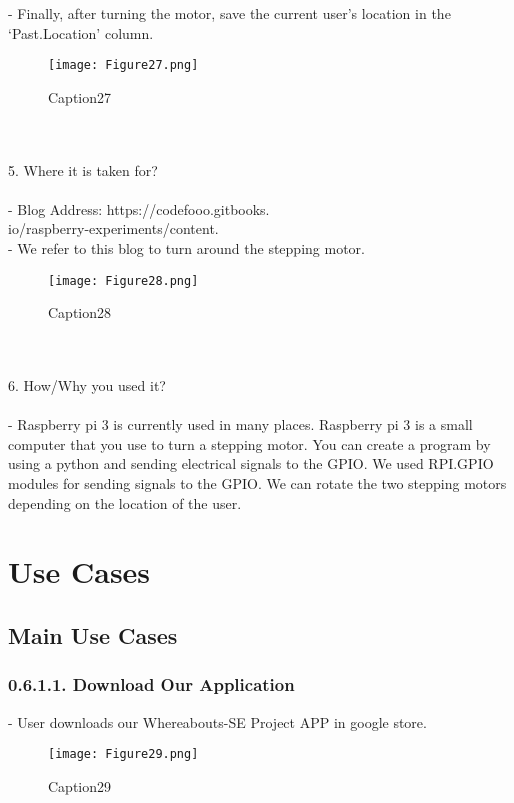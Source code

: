 \documentclass[10pt,a4paper,twocolumn]{report}
\begin{document}
\begin{enumerate}
- Finally, after turning the motor, save the current user’s location in the ‘Past.Location’ column. \\
			\begin{figure} [h]
				\texttt{[image: Figure27.png]}
				\caption{Caption27}
				\label{fig27}
			\end{figure}
		\\\\
		5. Where it is taken for? \\ \\
- Blog Address: https://codefooo.gitbooks.\\io/raspberry-experiments/content. \\
- We refer to this blog to turn around the stepping motor. \\
			\begin{figure}[h]
				\texttt{[image: Figure28.png]}
				\caption{Caption28}
				\label{fig28}
			\end{figure}
		\\\\
		6. How/Why you used it? \\\\
		- Raspberry pi 3 is currently used in many places. Raspberry pi 3 is a small computer that you use to turn a stepping motor. You can create a program by using a python and sending electrical signals to the GPIO. We used RPI.GPIO modules for sending signals to the GPIO. We can rotate the two stepping motors depending on the location of the user.\\	
		\end{enumerate}
		
		
\section{Use Cases}		
	\subsection{Main Use Cases}
		\subsubsection{0.6.1.1. Download Our Application}
		- User downloads our Whereabouts-SE Project APP in google store. \\
		\begin{figure}[h]
				\texttt{[image: Figure29.png]}
				\caption{Caption29}
				\label{fig29}
			\end{figure}
		\\\\
\end{document}
